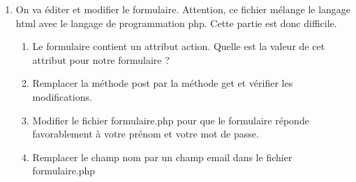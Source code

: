 \documentclass[11pt,a4paper]{article}
\begin{document}
\begin{enumerate}
\item On va éditer et modifier le formulaire. Attention, ce fichier mélange le langage \textsf{html} avec le langage de programmation \textsf{php}. Cette partie est donc difficile.

\begin{enumerate}

\item Le formulaire contient un attribut \textsf{action}. Quelle est la valeur de cet attribut pour notre formulaire ? \vspace{1cm}

\item Remplacer la méthode \textsf{post} par la méthode \textsf{get} et vérifier les modifications.

\item Modifier le fichier \textsf{formulaire.php} pour que le formulaire réponde favorablement à votre prénom et votre mot de passe.

\item Remplacer le champ \textsf{nom} par un champ \textsf{email} dans le fichier \textsf{formulaire.php}

\end{enumerate}


\end{enumerate}
\end{document}
